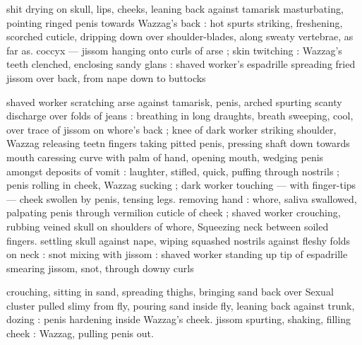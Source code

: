 shit drying on skull, lips, cheeks, leaning back against tamarisk
masturbating, pointing ringed penis towards Wazzag's back : hot
spurts striking, freshening, scorched cuticle, dripping down over
shoulder-blades, along sweaty vertebrae, as far as. coccyx — jissom
hanging onto curls of arse ; skin twitching : Wazzag's teeth
clenched, enclosing sandy glans : shaved worker's espadrille
spreading fried jissom over back, from nape down to buttocks

shaved worker scratching arse against tamarisk, penis, arched
spurting scanty discharge over folds of jeans : breathing in long
draughts, breath sweeping, cool, over trace of jissom on whore’s
back ; knee of dark worker striking shoulder, Wazzag releasing teetn
fingers taking pitted penis, pressing shaft down towards mouth
caressing curve with palm of hand, opening mouth, wedging penis
amongst deposits of vomit : laughter, stifled, quick, puffing through
nostrils ; penis rolling in cheek, Wazzag sucking ; dark worker
touching — with finger-tips — cheek swollen by penis, tensing legs.
removing hand : whore, saliva swallowed, palpating penis through
vermilion cuticle of cheek ; shaved worker crouching, rubbing veined
skull on shoulders of whore, Squeezing neck between soiled fingers.
settling skull against nape, wiping squashed nostrils against fleshy
folds on neck : snot mixing with jissom : shaved worker standing up
tip of espadrille smearing jissom, snot, through downy curls

crouching, sitting in sand, spreading thighs, bringing sand back over
Sexual cluster pulled slimy from fly, pouring sand inside fly, leaning
back against trunk, dozing : penis hardening inside Wazzag's cheek.
jissom spurting, shaking, filling cheek : Wazzag, pulling penis out.

